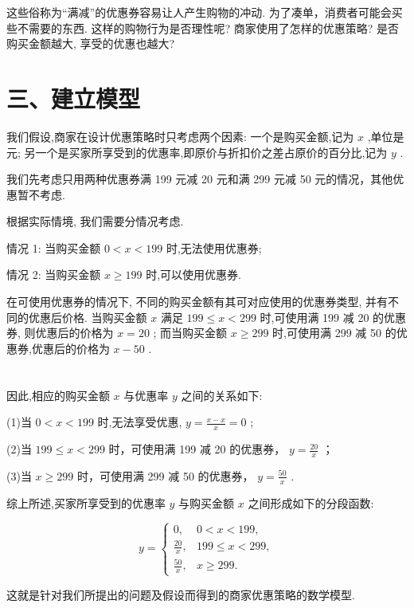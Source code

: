 \documentclass[10pt]{article}
\newcommand*\circled[1]{\tikz[baseline=(char.base)]{\node[shape=circle,draw,inner sep=1.5pt] (char) {\small #1};}}
\begin{document}
这些俗称为“满减”的优惠券容易让人产生购物的冲动. 为了凑单，消费者可能会买些不需要的东西. 这样的购物行为是否理性呢? 商家使用了怎样的优惠策略? 是否购买金额越大, 享受的优惠也越大?

\section*{三、建立模型}

我们假设,商家在设计优惠策略时只考虑两个因素: 一个是购买金额,记为 \(x\) ,单位是元; 另一个是买家所享受到的优惠率,即原价与折扣价之差占原价的百分比,记为 \(y\) .

我们先考虑只用两种优惠券满 199 元减 20 元和满 299 元减 50 元的情况，其他优惠暂不考虑.

根据实际情境, 我们需要分情况考虑.

情况 1: 当购买金额 \(0 < x < {199}\) 时,无法使用优惠券;

情况 2: 当购买金额 \(x \geq  {199}\) 时,可以使用优惠券.

在可使用优惠券的情况下, 不同的购买金额有其可对应使用的优惠券类型, 并有不同的优惠后价格. 当购买金额 \(x\) 满足 \({199} \leq  x < {299}\) 时,可使用满 199 减 20 的优惠券, 则优惠后的价格为 \(x = {20}\) ; 而当购买金额 \(x \geq  {299}\) 时,可使用满 299 减 50 的优惠券,优惠后的价格为 \(x - {50}\) .

\section*{}

因此,相应的购买金额 \(x\) 与优惠率 \(y\) 之间的关系如下:

(1)当 \(0 < x < {199}\) 时,无法享受优惠, \(y = \frac{x - x}{x} = 0\) ;

(2)当 \({199} \leq  x < {299}\) 时，可使用满 199 减 20 的优惠券， \(y = \frac{20}{x}\) ；

(3)当 \(x \geq  {299}\) 时，可使用满 299 减 50 的优惠券， \(y = \frac{50}{x}\) .

综上所述,买家所享受到的优惠率 \(y\) 与购买金额 \(x\) 之间形成如下的分段函数:

\[
y = \left\{  \begin{array}{ll} 0, & 0 < x < {199}, \\  \frac{20}{x}, & {199} \leq  x < {299}, \\  \frac{50}{x}, & x \geq  {299}. \end{array}\right.
\]
  \circled{1} 

这就是针对我们所提出的问题及假设而得到的商家优惠策略的数学模型.
\end{document}

